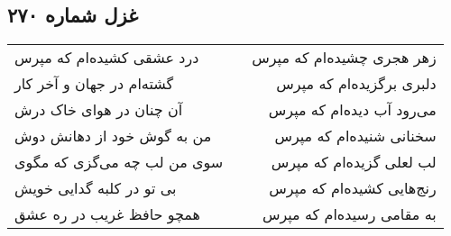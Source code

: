 \begin{center}
\section*{غزل شماره ۲۷۰}
\label{sec:sh270}
\begin{longtable}{l p{0.5cm} r}
درد عشقی کشیده‌ام که مپرس
&&
زهر هجری چشیده‌ام که مپرس
\\
گشته‌ام در جهان و آخر کار
&&
دلبری برگزیده‌ام که مپرس
\\
آن چنان در هوای خاک درش
&&
می‌رود آب دیده‌ام که مپرس
\\
من به گوش خود از دهانش دوش
&&
سخنانی شنیده‌ام که مپرس
\\
سوی من لب چه می‌گزی که مگوی
&&
لب لعلی گزیده‌ام که مپرس
\\
بی تو در کلبه گدایی خویش
&&
رنج‌هایی کشیده‌ام که مپرس
\\
همچو حافظ غریب در ره عشق
&&
به مقامی رسیده‌ام که مپرس
\\
\end{longtable}
\end{center}
